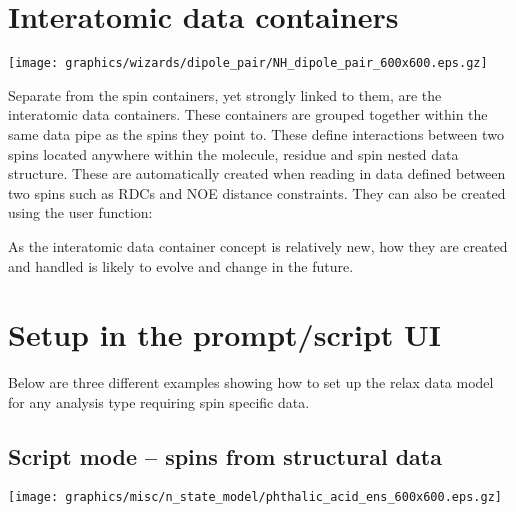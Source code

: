 
\section{Interatomic data containers} \label{sect: interatomic container}

\begin{figure*}[h]
\texttt{[image: graphics/wizards/dipole\_pair/NH\_dipole\_pair\_600x600.eps.gz]}
\end{figure*}

Separate from the spin containers, yet strongly linked to them, are the interatomic data containers.  These containers are grouped together within the same data pipe as the spins they point to.  These define interactions between two spins located anywhere within the molecule, residue and spin nested data structure.  These are automatically created when reading in data defined between two spins such as RDCs and NOE distance constraints.  They can also be created using the  user function:


As the interatomic data container concept is relatively new, how they are created and handled is likely to evolve and change in the future.




\section{Setup in the prompt/script UI}

Below are three different examples showing how to set up the relax data model for any analysis type requiring spin specific data.



\subsection{Script mode -- spins from structural data} \label{sect: script - structural data}

\begin{figure*}[h]
\texttt{[image: graphics/misc/n\_state\_model/phthalic\_acid\_ens\_600x600.eps.gz]}
\end{figure*}

